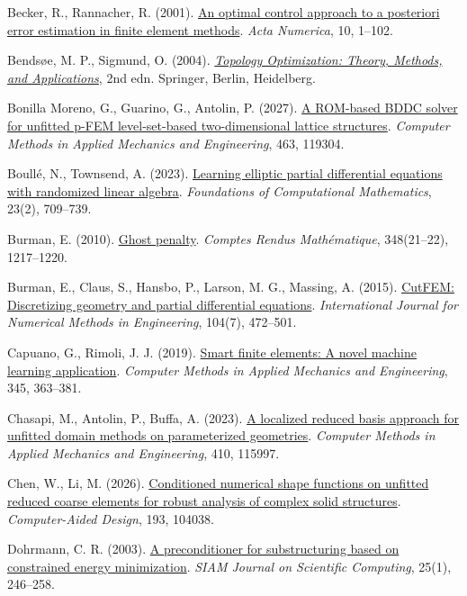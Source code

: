 \documentclass[preprint,12pt,authoryear]{elsarticle}
\begin{document}
Becker, R., Rannacher, R. (2001). \href{https://doi.org/10.1017/S0962492901000010}{An optimal control approach to a posteriori error estimation in finite element methods}. \emph{Acta Numerica}, 10, 1--102.

Bendsøe, M. P., Sigmund, O. (2004). \href{https://doi.org/10.1007/978-3-662-05086-6}{\emph{Topology Optimization: Theory, Methods, and Applications}}, 2nd edn. Springer, Berlin, Heidelberg.

Bonilla Moreno, G., Guarino, G., Antolin, P. (2027). \href{https://doi.org/10.1016/j.cma.2026.119304}{A ROM-based BDDC solver for unfitted p-FEM level-set-based two-dimensional lattice structures}. \emph{Computer Methods in Applied Mechanics and Engineering}, 463, 119304.

Boullé, N., Townsend, A. (2023). \href{https://doi.org/10.1007/s10208-022-09556-w}{Learning elliptic partial differential equations with randomized linear algebra}. \emph{Foundations of Computational Mathematics}, 23(2), 709--739.

Burman, E. (2010). \href{https://doi.org/10.1016/j.crma.2010.10.006}{Ghost penalty}. \emph{Comptes Rendus Mathématique}, 348(21--22), 1217--1220.

Burman, E., Claus, S., Hansbo, P., Larson, M. G., Massing, A. (2015). \href{https://doi.org/10.1002/nme.4823}{CutFEM: Discretizing geometry and partial differential equations}. \emph{International Journal for Numerical Methods in Engineering}, 104(7), 472--501.

Capuano, G., Rimoli, J. J. (2019). \href{https://doi.org/10.1016/j.cma.2018.10.046}{Smart finite elements: A novel machine learning application}. \emph{Computer Methods in Applied Mechanics and Engineering}, 345, 363--381.

Chasapi, M., Antolin, P., Buffa, A. (2023). \href{https://doi.org/10.1016/j.cma.2023.115997}{A localized reduced basis approach for unfitted domain methods on parameterized geometries}. \emph{Computer Methods in Applied Mechanics and Engineering}, 410, 115997.

Chen, W., Li, M. (2026). \href{https://doi.org/10.1016/j.cad.2026.104038}{Conditioned numerical shape functions on unfitted reduced coarse elements for robust analysis of complex solid structures}. \emph{Computer-Aided Design}, 193, 104038.

Dohrmann, C. R. (2003). \href{https://doi.org/10.1137/S1064827502412887}{A preconditioner for substructuring based on constrained energy minimization}. \emph{SIAM Journal on Scientific Computing}, 25(1), 246--258.
\end{document}
